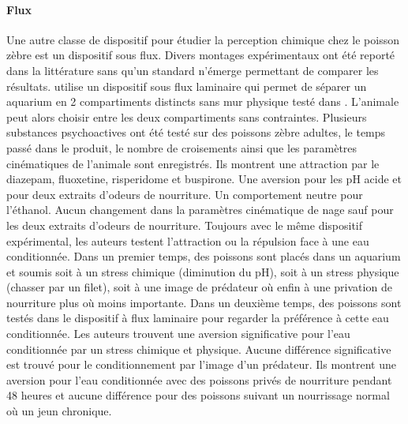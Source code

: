   \paragraph{Flux}
  Une autre classe de dispositif pour étudier la perception chimique chez le poisson zèbre est un dispositif sous flux. Divers montages expérimentaux ont été reporté dans la littérature sans qu'un standard n'émerge permettant de comparer les résultats.
  \cite{abreu2016acute, abreu2016behavioral} utilise un dispositif sous flux laminaire qui permet de séparer un aquarium en 2 compartiments distincts sans mur physique testé dans \cite{readman2013fish}. L'animale peut alors choisir entre les deux compartiments sans contraintes. Plusieurs substances psychoactives ont été testé sur des poissons zèbre adultes, le temps passé dans le produit, le nombre de croisements ainsi que les paramètres cinématiques de l'animale sont enregistrés. Ils montrent une attraction par le diazepam, fluoxetine, risperidome et buspirone. Une aversion pour les pH acide et pour deux extraits d'odeurs de nourriture. Un comportement neutre pour l'éthanol. Aucun changement dans la paramètres cinématique de nage  sauf pour les deux extraits d'odeurs de nourriture. Toujours avec le même dispositif expérimental, les auteurs testent l'attraction ou la répulsion face à une eau conditionnée. Dans un premier temps, des poissons sont placés dans un aquarium et soumis soit à un stress chimique (diminution du pH), soit à un stress physique (chasser par un filet), soit à une image de prédateur où enfin à une privation de nourriture plus où moins importante. Dans un deuxième temps, des poissons sont testés dans le dispositif à flux laminaire pour regarder la préférence à cette eau conditionnée. Les auteurs trouvent une aversion significative pour l'eau conditionnée par un stress chimique et physique. Aucune différence significative est trouvé pour le conditionnement par l'image d'un  prédateur. Ils montrent une aversion pour l'eau conditionnée avec des poissons privés de nourriture pendant 48 heures et aucune différence pour des poissons suivant un nourrissage normal où un jeun chronique.
  \medbreak
